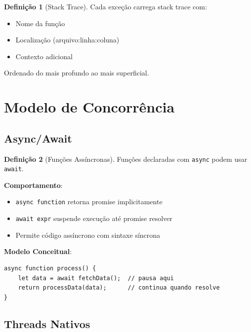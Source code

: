 \documentclass[12pt,a4paper]{article}
\theoremstyle{definition}
\newtheorem{definition}{Definição}[section]
\begin{document}
\begin{definition}[Stack Trace]
Cada exceção carrega stack trace com:
\begin{itemize}
    \item Nome da função
    \item Localização (arquivo:linha:coluna)
    \item Contexto adicional
\end{itemize}

Ordenado do mais profundo ao mais superficial.
\end{definition}

\section{Modelo de Concorrência}

\subsection{Async/Await}

\begin{definition}[Funções Assíncronas]
Funções declaradas com \texttt{async} podem usar \texttt{await}.

\textbf{Comportamento}:
\begin{itemize}
    \item \texttt{async function} retorna promise implicitamente
    \item \texttt{await expr} suspende execução até promise resolver
    \item Permite código assíncrono com sintaxe síncrona
\end{itemize}

\textbf{Modelo Conceitual}:
\begin{verbatim}
async function process() {
    let data = await fetchData();  // pausa aqui
    return processData(data);      // continua quando resolve
}
\end{verbatim}
\end{definition}

\subsection{Threads Nativos}
\end{document}
